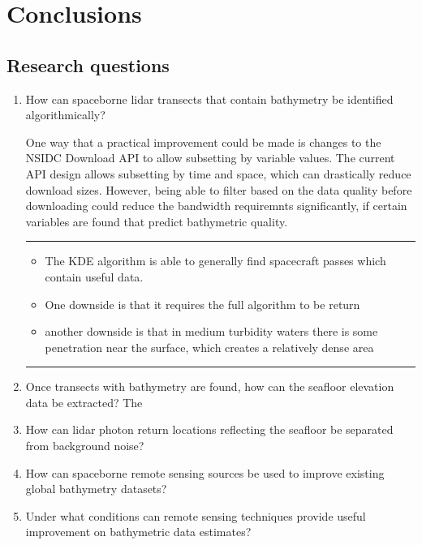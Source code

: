 \chapter{Conclusions}
\section{Research questions}
\begin{enumerate}
    \item How can spaceborne lidar transects that contain bathymetry be identified algorithmically?
    
    One way that a practical improvement could be made is changes to the NSIDC Download API to allow subsetting by variable values. The current API design allows subsetting by time and space, which can drastically reduce download sizes. However, being able to filter based on the data quality before downloading could reduce the bandwidth requiremnts significantly, if certain variables are found that predict bathymetric quality. 

    \rule{\paperwidth}{0.4pt}
    \color{blue}
    \begin{itemize}
        \item The KDE algorithm is able to generally find spacecraft passes which contain useful data.
        \item One downside is that it requires the full algorithm to be return
        \item another downside is that in medium turbidity waters there is some penetration near the surface, which creates a relatively dense area 
    \end{itemize}
    \color{black}
    \rule{\paperwidth}{0.4pt}
    
    \item Once transects with bathymetry are found, how can the seafloor elevation data be extracted?
    The 
    \item How can lidar photon return locations reflecting the seafloor be separated from background noise?
    \item How can spaceborne remote sensing sources be used to improve existing global bathymetry datasets?
    \item Under what conditions can remote sensing techniques provide useful improvement on bathymetric data estimates?
\end{enumerate}
